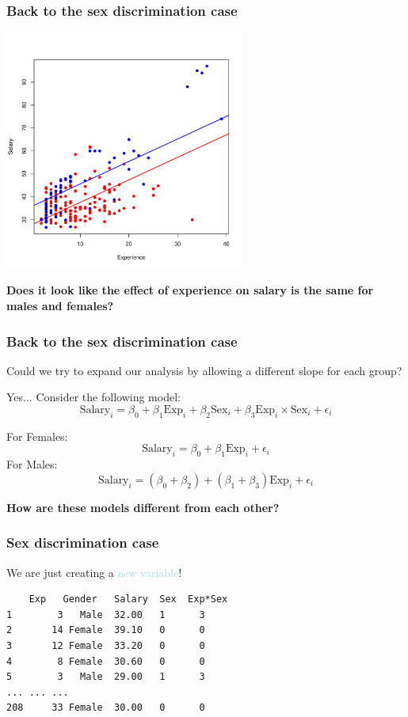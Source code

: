 \documentclass{beamer}
\newcommand{\bo}[1]{\textcolor{burntorange}{#1}}
\newcommand{\lb}[1]{\textcolor{lightblue}{#1}}
\newcommand{\sk}{\vspace{.5cm}}
\newcommand{\sko}{\vspace{.1in}}
\newcommand{\skoo}{\vspace{.2in}}
\begin{document}
\begin{frame}
\frametitle{Back to the sex discrimination case}
\vspace{-1.2cm}
\begin{center}
\includegraphics[width=3.1in]{figures/SalaryExp.pdf}
\end{center}
\vspace{-0.5cm}
{\color{lightblue}\bf Does it look like the effect of experience on salary is the same for males and females?}
\end{frame}

\begin{frame}
\frametitle{Back to the sex discrimination case}

\sko
Could we try to expand our analysis by allowing a different slope for each group?
\skoo

Yes... Consider the following model:
$$
\text{Salary}_i = \beta_0 + \beta_1 \text{Exp}_i + \beta_2 \text{Sex}_i + \beta_3 \text{Exp}_i \times \text{Sex}_i + \epsilon_i
$$

\skoo
{\color{red}For Females:
$$
\text{Salary}_i = \beta_0 + \beta_1 \text{Exp}_i  + \epsilon_i
$$
}
{\color{blue}For Males:
$$
\text{Salary}_i = (\beta_0 + \beta_2) + (\beta_1+\beta_3) \text{Exp}_i  + \epsilon_i
$$
}

\bo{\bf How are these models different from each other?}

\end{frame}


\begin{frame}[containsverbatim]
\frametitle{Sex discrimination case}

We are just creating a \lb{new variable}!

\sk
\begin{verbatim}
    Exp   Gender   Salary  Sex  Exp*Sex
1        3   Male  32.00   1      3
2       14 Female  39.10   0      0
3       12 Female  33.20   0      0
4        8 Female  30.60   0      0
5        3   Male  29.00   1      3
... ... ... 
208     33 Female  30.00   0      0
\end{verbatim}


\end{frame}
\end{document}
